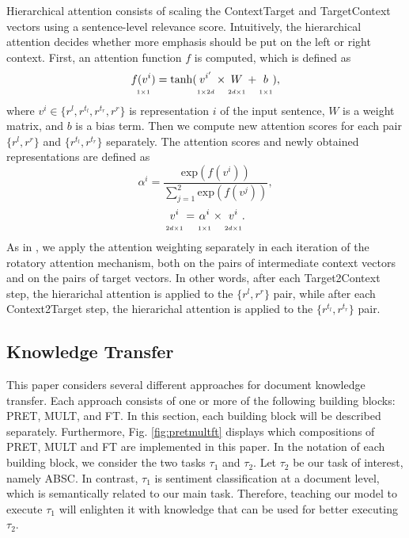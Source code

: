 Hierarchical attention consists of scaling the Context\-Target and Target\-Context vectors using a sentence-level relevance score. Intuitively, the hierarchical attention decides whether more emphasis should be put on the left or right context. 
First, an attention function $f$ is computed, which is defined as
\begin{equation}
    \underset{\scriptscriptstyle 1\times 1}{f(v^i)\strut}=\mathrm{tanh}(\underset{\scriptscriptstyle 1\times 2d}{v^{i'}\strut}\times \underset{\scriptscriptstyle 2d\times 1}{W\strut}+\underset{\scriptscriptstyle 1\times 1}{b\strut}),
\end{equation}
where $v^i\in \{r^l, r^{t_l}, r^{t_r}, r^r\}$ is representation $i$ of the input sentence, $W$ is a weight matrix, and $b$ is a bias term. Then we compute new attention scores for each pair $\{r^l,r^r\}$ and $\{r^{t_l},r^{t_r}\}$ separately. The attention scores and newly obtained representations are defined as
\begin{equation}
    \alpha^i=\frac{\mathrm{exp}(f(v^i))}{\sum_{j=1}^2 \mathrm{exp}(f(v^j))},
\end{equation}
\begin{equation}
    \underset{\scriptscriptstyle 2d\times 1}{v^i\strut}=\underset{\scriptscriptstyle 1\times 1}{\alpha^i\strut}\times \underset{\scriptscriptstyle 2d\times 1}{v^i\strut}.
\end{equation}
As in \cite{Trusca2020}, we apply the attention weighting separately in each iteration of the rotatory attention mechanism, both on the pairs of intermediate context vectors and on the pairs of target vectors. In other words, after each Target2Context step, the hierarichal attention is applied to the $\{r^l,r^r\}$ pair, while after each Context2Target step, the hierarichal attention is applied to the $\{r^{t_l},r^{t_r}\}$ pair.

\subsection{Knowledge Transfer}
This paper considers several different approaches for document knowledge transfer. Each approach consists of one or more of the following building blocks: PRET, MULT, and FT. In this section, each building block will be described separately. Furthermore, Fig. \ref{fig:pretmultft} displays which compositions of PRET, MULT and FT are implemented in this paper. In the notation of each building block, we consider the two tasks $\tau_1$ and $\tau_2$. Let $\tau_2$ be our task of interest, namely ABSC. In contrast, $\tau_1$ is sentiment classification at a document level, which is semantically related to our main task. Therefore, teaching our model to execute $\tau_1$ will enlighten it with knowledge that can be used for better executing $\tau_2$. 

